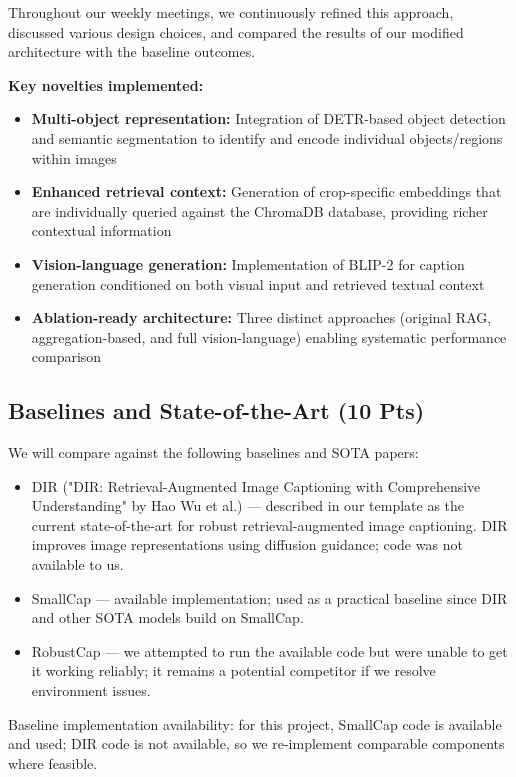 \documentclass[11pt]{article}
\begin{document}
Throughout our weekly meetings, we continuously refined this approach, discussed various design choices, and compared the results of our modified architecture with the baseline outcomes.

\textbf{Key novelties implemented:}
\begin{itemize}
  \item \textbf{Multi-object representation:} Integration of DETR-based object detection and semantic segmentation to identify and encode individual objects/regions within images
  \item \textbf{Enhanced retrieval context:} Generation of crop-specific embeddings that are individually queried against the ChromaDB database, providing richer contextual information
  \item \textbf{Vision-language generation:} Implementation of BLIP-2 for caption generation conditioned on both visual input and retrieved textual context
  \item \textbf{Ablation-ready architecture:} Three distinct approaches (original RAG, aggregation-based, and full vision-language) enabling systematic performance comparison
\end{itemize}


\subsection{Baselines and State-of-the-Art (10 Pts)}
We will compare against the following baselines and SOTA papers:
\begin{itemize}
  \item DIR ("DIR: Retrieval-Augmented Image Captioning with Comprehensive Understanding" by Hao Wu et al.) — described in our template as the current state-of-the-art for robust retrieval-augmented image captioning. DIR improves image representations using diffusion guidance; code was not available to us.
  \item SmallCap — available implementation; used as a practical baseline since DIR and other SOTA models build on SmallCap.
  \item RobustCap — we attempted to run the available code but were unable to get it working reliably; it remains a potential competitor if we resolve environment issues.
\end{itemize}

Baseline implementation availability: for this project, SmallCap code is available and used; DIR code is not available, so we re-implement comparable components where feasible.
\end{document}
